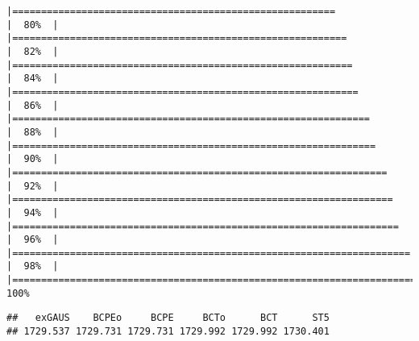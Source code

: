 \begin{verbatim}
|========================================================              |  80%  |                                                                              |==========================================================            |  82%  |                                                                              |===========================================================           |  84%  |                                                                              |============================================================          |  86%  |                                                                              |==============================================================        |  88%  |                                                                              |===============================================================       |  90%  |                                                                              |=================================================================     |  92%  |                                                                              |==================================================================    |  94%  |                                                                              |===================================================================   |  96%  |                                                                              |===================================================================== |  98%  |                                                                              |======================================================================| 100%
\end{verbatim}

\begin{Shaded}
\begin{Highlighting}[]
\SpecialCharTok{$}\NormalTok{fit[}\SpecialCharTok{:}\NormalTok{]}
\end{Highlighting}
\end{Shaded}

\begin{verbatim}
##   exGAUS    BCPEo     BCPE     BCTo      BCT      ST5 
## 1729.537 1729.731 1729.731 1729.992 1729.992 1730.401
\end{verbatim}

\begin{Shaded}
\begin{Highlighting}[]
\OtherTok{\textless{}{-}} \NormalTok{, }\NormalTok{, }\NormalTok{(}\NormalTok{,}\NormalTok{), }\NormalTok{(}\NormalTok{,}\NormalTok{), }
\end{Highlighting}
\end{Shaded}

